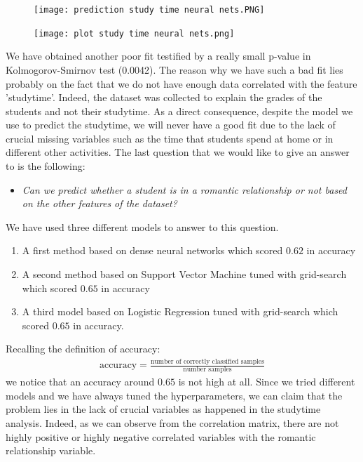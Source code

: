 \documentclass[a4paper, 11pt]{report}
\theoremstyle{definition}
\numberwithin{equation}{section}		%
\numberwithin{figure}{section}			%
\numberwithin{table}{section}				%
\begin{document}
\begin{figure}[h]\centering
\texttt{[image: prediction study time neural nets.PNG]}
\end{figure}
    \begin{figure}[h]\centering
\texttt{[image: plot study time neural nets.png]}
\end{figure}

We have obtained another poor fit testified by a really small p-value in Kolmogorov-Smirnov test (0.0042). The reason why we have such a bad fit lies probably on the fact that we do not have enough data correlated with the feature 'studytime'. Indeed, the dataset was collected to explain the grades of the students and not their studytime. As a direct consequence, despite the model we use to predict the studytime, we will never have a good fit due to the lack of crucial missing variables such as the time that students spend at home or in different other activities.
The last question that we would like to give an answer to is the following:
\begin{itemize}
    \item \textit{Can we predict whether a student is in a romantic relationship or not based on the other features of the dataset?}
\end{itemize}
We have used three different models to answer to this question.
\begin{enumerate}
    \item A first method based on dense neural networks which scored $0.62$ in accuracy
    \item A second method based on Support Vector Machine tuned with grid-search which scored $0.65$ in accuracy 
    \item A third model based on Logistic Regression tuned with grid-search which scored $0.65$ in accuracy.
\end{enumerate}
Recalling the definition of accuracy:
\begin{align*}
    \text{accuracy} = \frac{\text{number of correctly classified samples}}{\text{number samples}}
\end{align*}
we notice that an accuracy around $0.65$ is not high at all. Since we tried different models and we have always tuned the hyperparameters, we can claim that the problem lies in the lack of crucial variables as happened in the studytime analysis. Indeed, as we can observe from the correlation matrix, there are not highly positive or highly negative correlated variables with the romantic relationship variable.
\end{document}
